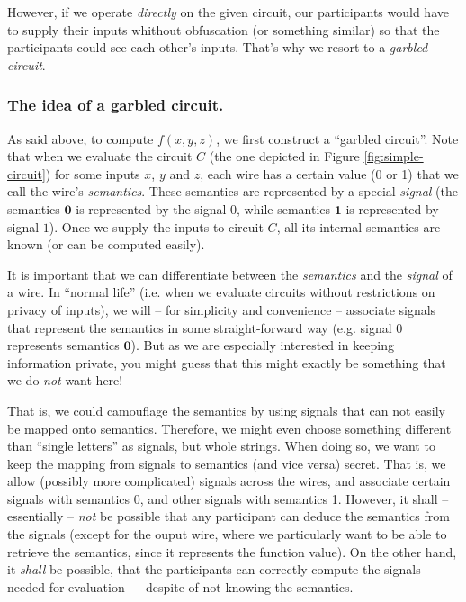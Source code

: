 \message{ !name(seminar.tex)}\documentclass{llncs}
\begin{document}
However, if we operate \emph{directly} on the given circuit, our participants would have to supply their inputs whithout obfuscation (or something similar) so that the participants could see each other's inputs. That's why we resort to a \emph{garbled circuit}.

\subsubsection{The idea of a  garbled circuit.}

As said above, to compute $f(x,y,z)$, we first construct a ``garbled circuit''. Note that when we evaluate the circuit $C$ (the one depicted in Figure \ref{fig:simple-circuit}) for some inputs $x$, $y$ and $z$, each wire has a certain value (0 or 1) that we call the wire's \emph{semantics}. These semantics are represented by a special \emph{signal} (the semantics $\mathbf{0}$ is represented by the signal $0$, while semantics $\mathbf{1}$ is represented by signal $1$). Once we supply the inputs to circuit $C$, all its internal semantics are known (or can be computed easily).

It is important that we can differentiate between the \emph{semantics} and the \emph{signal} of a wire. In ``normal life'' (i.e. when we evaluate circuits without restrictions on privacy of inputs), we will -- for simplicity and convenience -- associate signals that represent the semantics in some straight-forward way (e.g. signal $0$ represents semantics $\mathbf{0}$). But as we are especially interested in keeping information private, you might guess that this might exactly be something that we do \emph{not} want here!

That is, we could camouflage the semantics by using signals that can not easily be mapped onto semantics. Therefore, we might even choose something different than ``single letters'' as signals, but whole strings. When doing so, we want to keep the mapping from signals to semantics (and vice versa) secret. That is, we allow (possibly more complicated) signals across the wires, and associate certain signals with semantics 0, and other signals with semantics 1. However, it shall -- essentially -- \emph{not} be possible that any participant can deduce the semantics from the signals (except for the ouput wire, where we particularly want to be able to retrieve the semantics, since it represents the function value). On the other hand, it \emph{shall} be possible, that the participants can correctly compute the signals needed for evaluation --- despite of not knowing the semantics.
\end{document}
